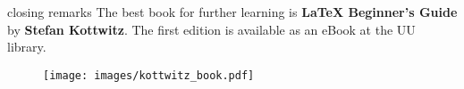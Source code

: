 \begin{frame}{closing remarks}
    The best book for further learning is \textbf{LaTeX Beginner's Guide} by \textbf{Stefan Kottwitz}. 
    The first edition is available as an eBook at the UU library.
    \begin{figure}
        \centering
    \texttt{[image: images/kottwitz\_book.pdf]}
\end{figure}
\end{frame}